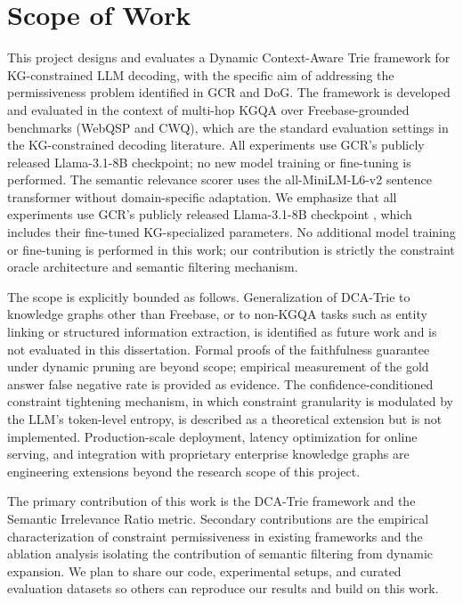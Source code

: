 \section{Scope of Work}

This project designs and evaluates a Dynamic Context-Aware Trie framework for KG-constrained LLM decoding, with the specific aim of addressing the permissiveness problem identified in GCR and DoG. The framework is developed and evaluated in the context of multi-hop KGQA over Freebase-grounded benchmarks (WebQSP and CWQ), which are the standard evaluation settings in the KG-constrained decoding literature. All experiments use GCR's publicly released Llama-3.1-8B checkpoint; no new model training or fine-tuning is performed. The semantic relevance scorer uses the all-MiniLM-L6-v2 sentence transformer without domain-specific adaptation.
We emphasize that all experiments use GCR's publicly released Llama-3.1-8B checkpoint \citep{luo2025-graph-constrained-reasoning}, which includes their fine-tuned KG-specialized parameters. No additional model training or fine-tuning is performed in this work; our contribution is strictly the constraint oracle architecture and semantic filtering mechanism.

The scope is explicitly bounded as follows. Generalization of DCA-Trie to knowledge graphs other than Freebase, or to non-KGQA tasks such as entity linking or structured information extraction, is identified as future work and is not evaluated in this dissertation. Formal proofs of the faithfulness guarantee under dynamic pruning are beyond scope; empirical measurement of the gold answer false negative rate is provided as evidence. The confidence-conditioned constraint tightening mechanism, in which constraint granularity is modulated by the LLM's token-level entropy, is described as a theoretical extension but is not implemented. Production-scale deployment, latency optimization for online serving, and integration with proprietary enterprise knowledge graphs are engineering extensions beyond the research scope of this project.

The primary contribution of this work is the DCA-Trie framework and the Semantic Irrelevance Ratio metric. Secondary contributions are the empirical characterization of constraint permissiveness in existing frameworks and the ablation analysis isolating the contribution of semantic filtering from dynamic expansion. We plan to share our code, experimental setups, and curated evaluation datasets so others can reproduce our results and build on this work.

